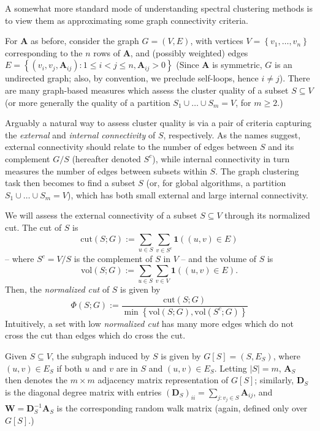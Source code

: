 \documentclass{article}
\newcommand{\set}[1]{\left\{#1\right\}}
\newcommand{\vol}{\mathrm{vol}}
\newcommand{\cut}{\mathrm{cut}}
\newcommand{\abs}[1]{\left \lvert #1 \right \rvert}
\newcommand{\1}{\mathbf{1}}
\newcommand{\Abf}{\mathbf{A}}
\newcommand{\Wbf}{\mathbf{W}}
\newcommand{\Dbf}{\mathbf{D}}
\theoremstyle{aldenthm}
\theoremstyle{remark}
\begin{document}
A somewhat more standard mode of understanding spectral clustering methods is to view them as approximating some graph connectivity criteria.

For $\Abf$ as before, consider the graph $G  = (V,E)$, with vertices $V = \set{v_1, \ldots, v_n}$ corresponding to the $n$ rows of $\Abf$, and (possibly weighted) edges $E = \set{(v_i,v_j,\Abf_{ij}): 1 \leq i < j \leq n, \Abf_{ij} > 0}$ (Since $\Abf$ is symmetric, $G$ is an undirected graph; also, by convention, we preclude self-loops, hence $i \neq j$). There are many \cite{yang2015,fortunato2010} graph-based measures which assess the cluster quality of a subset $S \subseteq V$ (or more generally the quality of a partition $S_1 \cup \ldots \cup S_m = V$, for $m \geq 2$.)

Arguably a natural way to assess cluster quality is via a pair of criteria capturing the \textit{external} and \textit{internal connectivity} of $S$, respectively.  As the names suggest, external connectivity should relate to the number of edges between $S$ and its complement $G / S$ (hereafter denoted $S^c$), while internal connectivity in turn measures the number of edges between subsets within $S$. The graph clustering task then becomes to find a subset $S$ (or, for global algorithms, a partition $S_1 \cup \ldots \cup S_m = V$), which has both small external and large internal connectivity. 

We will assess the external connectivity of a subset $S \subseteq V$ through its normalized cut. The cut of $S$ is
\begin{equation*}
\cut(S; G) := \sum_{u \in S} \sum_{v \in S^c} \1\left((u,v) \in E \right)
\end{equation*}
-- where $S^c = V / S$ is the complement of $S$ in $V$ -- and the volume of $S$ is
\begin{equation*}
\vol(S; G) := \sum_{u \in S} \sum_{v \in V} \1\left((u,v) \in E \right).
\end{equation*}
Then, the \emph{normalized cut} of $S$ is given by
\begin{equation}
\label{eqn: norm_cut}
\Phi(S; G) := \frac{\cut(S; G)}{ \min\left\{\vol(S; G), \vol(S^c; G) \right\} }
\end{equation} 
Intuitively, a set with low \textit{normalized cut} has many more edges which do not cross the cut than edges which do cross the cut. 

Given $S \subseteq V$, the subgraph induced by $S$ is given by $G[S] = (S, E_S)$, where $(u,v) \in E_S$ if both $u$ and $v$ are in $S$ and $(u,v) \in E_S$. Letting $\abs{S} = m$, $\Abf_S$ then denotes the $m \times m$ adjacency matrix representation of $G[S]$; similarly, $\Dbf_S$ is the diagonal degree matrix with entries $(\Dbf_{S})_{ii} = \sum_{j: v_j \in S} \Abf_{ij}$, and $\Wbf = \Dbf_S^{-1} \Abf_S$ is the corresponding random walk matrix (again, defined only over $G[S]$.)
\end{document}
